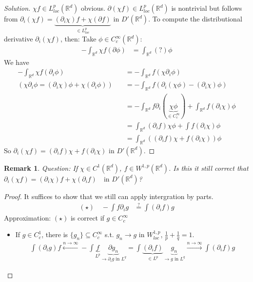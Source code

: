 \documentclass{report}
\theoremstyle{tommy}
\newtheorem{rem}[defn]{Remark}
\begin{document}
  \begin{proof}[Solution]
    \(\chi f \in L_{loc}^p(\mathbb{R}^d)\) obvious. \(\partial (\chi f) \in L_{loc}^p(\mathbb{R}^d)\) is nontrivial but follows from \(\partial_i (\chi f) = \underbrace{(\partial_i \chi) f + \chi (\partial f)}_{\in L_{loc}^p}\) in \(D'(\mathbb{R}^d)\). To compute the distributional derivative \(\partial_i (\chi f)\), then: Take \(\phi \in C_c^\infty(\mathbb{R}^d)\): 
    \begin{align*}
      - \int_{\mathbb{R}^d} \chi f (\partial \phi)
      &= \int_{\mathbb{R}^d}(?) \phi 
    \end{align*}
    We have 
    \begin{align*}
      - \int_{\mathbb{R}^d}\chi f(\partial_i \phi) 
      &= - \int_{\mathbb{R}^d} f(\chi \partial_i \phi) \\
      (\chi \partial_i \phi = (\partial_i \chi)\phi + \chi(\partial_i \phi)) \quad &= - \int_{\mathbb{R}^d} f \left(\partial_i(\chi \phi)-(\partial_i \chi) \phi\right) \\
      &= - \int_{\mathbb{R}^d} f \partial_i(\underbrace{\chi \phi}_{\in C_c^\infty}) + \int_{\mathbb{R}^d} f (\partial_i \chi) \phi \\
      &= \int_{\mathbb{R}^d} (\partial_i f) \chi \phi + \int f(\partial_i \chi) \phi \\
      &= \int_{\mathbb{R}^d} ((\partial_i f) \chi + f (\partial_i \chi)) \phi
    \end{align*}
    So \(\partial_i (\chi f) = (\partial_i f) \chi + f (\partial_i \chi)\) in \(D'(\mathbb{R}^d)\).
  \end{proof}

  \begin{rem}
    Question: If \(\chi \in C^1(\mathbb{R}^d)\), \(f \in W^{1,p}(\mathbb{R}^d)\). Is this it still correct that \(\partial_i (\chi f) = (\partial_i \chi) f + \chi(\partial_i f) \quad \text{in } D'(\mathbb{R}^d)\)?
  \end{rem}
  
  \begin{proof}
    It suffices to show that we still can apply intergration by parts.
    \begin{align*}
      (\star) \quad - \int f \partial_i g
      &\overset{?}{=} \int(\partial_i f) g
    \end{align*}
    Approximation: \((\star)\) is correct if \(g \in C_c^\infty\) \begin{itemize}
      \item If \(g \in C_c^1\), there is \(\{g_n\} \subseteq C_c^\infty\) s.t. \(g_n \to g\) in \(W_{loc}^{1,p}\), \(\frac{1}{p} + \frac{1}{q} = 1\).
      \begin{align*}
        \int (\partial_i g) f \xleftarrow{n \to \infty} - \int \underbrace{f}_{L^p} \underbrace{\partial g_n}_{\to \partial_i g \text{ in } L^q} = \int \underbrace{(\partial_i f)}_{\in L^p} \underbrace{g_n}_{\to g \text{ in } L^q} \xrightarrow{n \to \infty} \int (\partial_i f) g
      \end{align*}
    \end{itemize}
  \end{proof}
\end{document}
